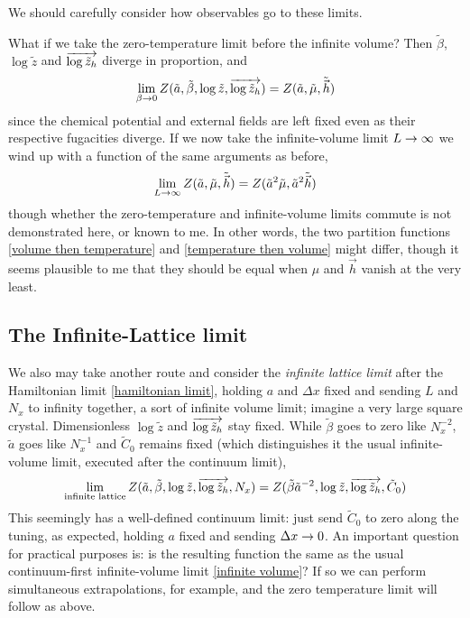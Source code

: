 We should carefully consider how observables go to these limits.

What if we take the zero-temperature limit before the infinite volume?
Then $\tilde{\beta}$, $\log\tilde{z}$ and $\overrightarrow{\log\tilde{z}_h}$ diverge in proportion, and 
\begin{align}
    \lim_{\beta\rightarrow0} Z(\tilde{a}, \tilde{\beta}, \log\tilde{z}, \overrightarrow{\log \tilde{z}_h})
    =
    Z(\tilde{a}, \tilde{\mu}, \tilde{\vec{h}})
\end{align}
since the chemical potential and external fields are left fixed even as their respective fugacities diverge.
If we now take the infinite-volume limit $L\rightarrow\infty$ we wind up with a function of the same arguments as before,
\begin{align}
    \lim_{L\rightarrow\infty}
    Z(\tilde{a}, \tilde{\mu}, \tilde{\vec{h}})
    =
    Z( \tilde{a}^2\tilde{\mu}, \tilde{a}^2 \tilde{\vec{h}} )
    \label{eq:temperature then volume}
\end{align}
though whether the zero-temperature and infinite-volume limits commute is not demonstrated here, or known to me.
In other words, the two partition functions \eqref{volume then temperature} and \eqref{temperature then volume} might differ, though it seems plausible to me that they should be equal when $\mu$ and $\vec{h}$ vanish at the very least.

\subsection{The Infinite-Lattice limit}

We also may take another route and consider the \emph{infinite lattice limit} after the Hamiltonian limit \eqref{hamiltonian limit}, holding $a$ and $\Delta x$ fixed and sending $L$ and $N_x$ to infinity together, a sort of infinite volume limit; imagine a very large square crystal.
Dimensionless $\log \tilde{z}$ and $\overrightarrow{\log \tilde{z}_h}$ stay fixed.
While $\tilde{\beta}$ goes to zero like $N_x^{-2}$, $\tilde{a}$ goes like $N_x^{-1}$ and $\tilde{C}_0$ remains fixed (which distinguishes it the usual infinite-volume limit, executed after the continuum limit),
\begin{align}
    \lim_{\text{infinite lattice}} Z(\tilde{a}, \tilde{\beta}, \log\tilde{z}, \overrightarrow{\log\tilde{z}_h}, N_x) 
    =
    Z(\tilde{\beta}\tilde{a}^{-2}, \log\tilde{z}, \overrightarrow{\log\tilde{z}_h}, \tilde{C}_0)
\end{align}
This seemingly has a well-defined continuum limit: just send $\tilde{C}_0$ to zero along the tuning, as expected, holding $a$ fixed and sending $\Delta x\rightarrow 0$.
An important question for practical purposes is: is the resulting function the same as the usual continuum-first infinite-volume limit \eqref{infinite volume}?
If so we can perform simultaneous extrapolations, for example, and the zero temperature limit will follow as above.
